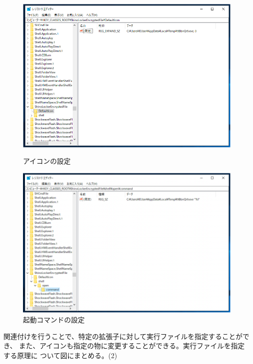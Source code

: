 \documentclass[dvipdfmx,autodetect-engine]{jsarticle}
\begin{document}
\begin{figure}[H]
  \centering
  \begin{minipage}[b]{0.45\linewidth}
  \begin{center}
    \includegraphics[keepaspectratio,scale=0.4]{pic18.png}
    \end{center}
    \caption{アイコンの設定}
  \end{minipage}
  \begin{minipage}[b]{0.45\linewidth}
  \begin{center}
    \includegraphics[keepaspectratio,scale=0.4]{pic19.png}
    \end{center}
    \caption{起動コマンドの設定}
  \end{minipage}
\end{figure}

関連付けを行うことで、特定の拡張子に対して実行ファイルを指定することができ、
また、アイコンも指定の物に変更することができる。実行ファイルを指定する原理に
ついて図にまとめる。(2)
\end{document}
